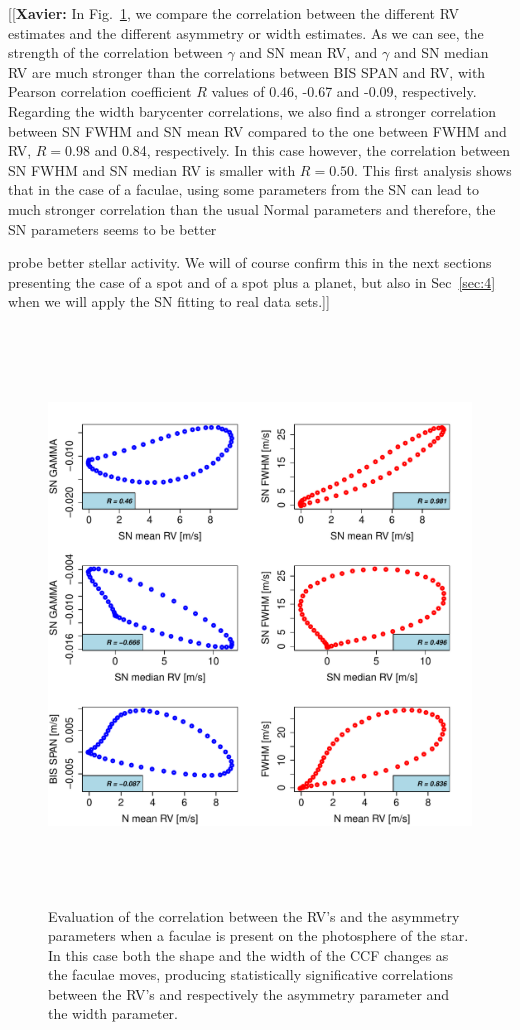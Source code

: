 \documentclass{aa}
\newcommand{\xavier}[1]{{\color{blue}[[\textbf{Xavier: }#1]]}}
\begin{document}
\xavier{In Fig.~\ref{fig:faculae.corr}, we compare the correlation between the different RV estimates and the different asymmetry or width estimates. As we can see, the strength of the correlation between $\gamma$ and SN mean RV, and $\gamma$ and SN median RV are much stronger than the correlations between BIS SPAN and RV, with Pearson correlation coefficient $R$ values of 0.46, -0.67 and -0.09, respectively. Regarding the width barycenter correlations, we also find a stronger correlation between SN FWHM and SN mean RV compared to the one between FWHM and RV, $R=0.98$ and 0.84, respectively. In this case however, the correlation between SN FWHM and SN median RV is smaller with $R=0.50$. This first analysis shows that in the case of a faculae, using some parameters from the SN can lead to much stronger correlation than the usual Normal parameters and therefore, the SN parameters seems to be better 

probe better stellar activity. We will of course confirm this in the next sections presenting the case of a spot and of a spot plus a planet, but also in Sec~\ref{sec:4} when we will apply the SN fitting to real data sets.}

\begin{figure}[htbp]
\begin{center}
\includegraphics[height = 6in]{SOAP_FACULAE_Comparison_para_SN.pdf} 
   \caption{Evaluation of the correlation between the RV's and the asymmetry parameters when a faculae is present on the photosphere of the star. In this case both the shape and the width of the CCF changes as the faculae moves, producing statistically significative correlations between the RV's and respectively the asymmetry parameter and the width parameter.}
    \label{fig:faculae.corr}
\end{center}
\end{figure}
\end{document}
